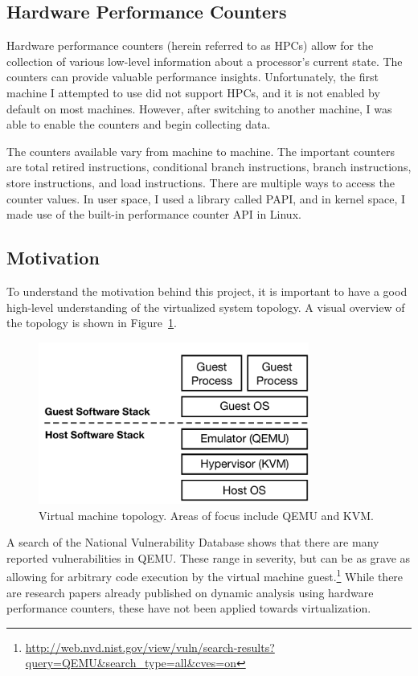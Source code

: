 \documentclass[notitlepage]{article}
\begin{document}
\subsection{Hardware Performance Counters}
Hardware performance counters (herein referred to as HPCs) allow for the
collection of various low-level information about a processor's current state.
The counters can provide valuable performance insights. Unfortunately, the first
machine I attempted to use did not support HPCs, and it is not enabled by
default on most machines.  However, after switching to another machine, I was
able to enable the counters and begin collecting data.

The counters available vary from machine to machine. The important counters are
total retired instructions, conditional branch instructions, branch
instructions, store instructions, and load instructions.  There are multiple
ways to access the counter values. In user space, I used a library called
PAPI\cite{papi}, and in kernel space, I made use of the built-in performance
counter API in Linux.

\subsection{Motivation}
To understand the motivation behind this project, it is important to have a good
high-level understanding of the virtualized system topology. A visual overview
of the topology is shown in Figure~\ref{fig:vmtop}.

\begin{figure}[htp]
    \centering
    \includegraphics[width=3.5in]{topology.pdf}
    \caption{Virtual machine topology. Areas of focus include QEMU and KVM.}
    \label{fig:vmtop}
\end{figure}

A search of the National Vulnerability Database shows that there are many
reported vulnerabilities in QEMU. These range in severity, but can be as grave
as allowing for arbitrary code execution by the virtual machine
guest.\footnote{\url{http://web.nvd.nist.gov/view/vuln/search-results?query=QEMU&search_type=all&cves=on}}
While there are research papers already published on dynamic analysis using
hardware performance counters, these have not been applied towards
virtualization\cite{numchecker}\cite{feasibility}\cite{pc}.
\end{document}
